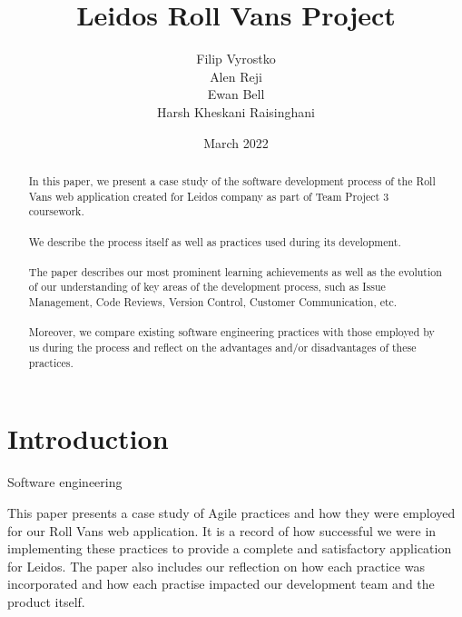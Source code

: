 \documentclass{l3proj}
\begin{document}
\title{Leidos Roll Vans Project}

\author{Filip Vyrostko \\
        Alen Reji \\
        Ewan Bell \\
        Harsh Kheskani Raisinghani}

\date{March 2022}

\maketitle

\begin{abstract}

In this paper, we present a case study of the software development process of the Roll Vans web application created for Leidos company as part of Team Project 3 coursework.\\\\
We describe the process itself as well as practices used during its development.\\\\
The paper describes our most prominent learning achievements as well as the evolution of our understanding of key areas of the development process, such as Issue Management, Code Reviews, Version Control, Customer Communication, etc.\\\\ 
Moreover, we compare existing software engineering practices with those employed by us during the process and reflect on the advantages and/or disadvantages of these practices.

\end{abstract}

\educationalconsent

\newpage

\section{Introduction}

Software engineering 

This paper presents a case study of Agile practices and how they were employed for our Roll Vans web application. It is a record of how successful we were in implementing these practices to provide a complete and satisfactory application for Leidos. The paper also includes our reflection on how each practice was incorporated and how each practise impacted our development team and the product itself.
\end{document}
